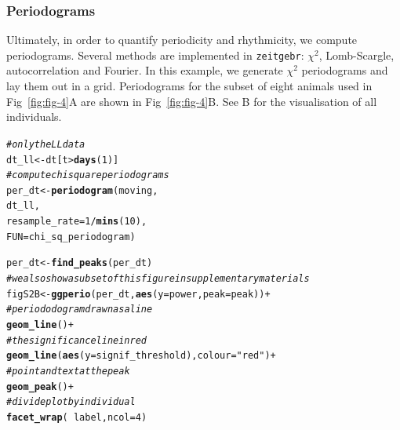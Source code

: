\documentclass[10pt,letterpaper]{article}\usepackage[]{graphicx}\usepackage[]{color}
\makeatletter
\newcommand{\hlnum}[1]{\textcolor[rgb]{0.686,0.059,0.569}{#1}}%
\newcommand{\hlstr}[1]{\textcolor[rgb]{0.192,0.494,0.8}{#1}}%
\newcommand{\hlcom}[1]{\textcolor[rgb]{0.678,0.584,0.686}{\textit{#1}}}%
\newcommand{\hlopt}[1]{\textcolor[rgb]{0,0,0}{#1}}%
\newcommand{\hlstd}[1]{\textcolor[rgb]{0.345,0.345,0.345}{#1}}%
\newcommand{\hlkwb}[1]{\textcolor[rgb]{0.69,0.353,0.396}{#1}}%
\newcommand{\hlkwc}[1]{\textcolor[rgb]{0.333,0.667,0.333}{#1}}%
\newcommand{\hlkwd}[1]{\textcolor[rgb]{0.737,0.353,0.396}{\textbf{#1}}}%
\newenvironment{kframe}{%
 \def\at@end@of@kframe{}%
 \ifinner\ifhmode%
  \def\at@end@of@kframe{\end{minipage}}%
  \begin{minipage}{\columnwidth}%
 \fi\fi%
 \def\FrameCommand##1{\hskip\@totalleftmargin \hskip-\fboxsep
 \colorbox{shadecolor}{##1}\hskip-\fboxsep
     \hskip-\linewidth \hskip-\@totalleftmargin \hskip\columnwidth}%
 \MakeFramed {\advance\hsize-\width
   \@totalleftmargin\z@ \linewidth\hsize
   \@setminipage}}%
 {\par\unskip\endMakeFramed%
 \at@end@of@kframe}
\newenvironment{knitrout}{}{} %
\makeatother
\begin{document}
\subsubsection*{Periodograms}
Ultimately, in order to quantify periodicity and rhythmicity, we compute periodograms.
Several methods are implemented in \texttt{zeitgebr}: $\chi{}^2$, Lomb-Scargle, autocorrelation 
and Fourier.
In this example, we generate $\chi{}^2$ periodograms and lay them out in a grid.
Periodograms for the subset of eight animals used in Fig~\ref{fig:fig-4}A are shown in Fig~\ref{fig:fig-4}B. 
See B for the visualisation of all individuals.

\begin{knitrout}
\color{fgcolor}\begin{kframe}
\begin{alltt}
\hlcom{# only the LL data}
\hlstd{dt_ll} \hlkwb{<-} \hlstd{dt[t} \hlopt{>} \hlkwd{days}\hlstd{(}\hlnum{1}\hlstd{)]}
\hlcom{# compute chi square periodograms }
\hlstd{per_dt} \hlkwb{<-} \hlkwd{periodogram}\hlstd{(moving,}
                        \hlstd{dt_ll,}
                        \hlkwc{resample_rate} \hlstd{=} \hlnum{1} \hlopt{/} \hlkwd{mins}\hlstd{(}\hlnum{10}\hlstd{),}
                        \hlkwc{FUN}\hlstd{=chi_sq_periodogram)}

\hlstd{per_dt} \hlkwb{<-} \hlkwd{find_peaks}\hlstd{(per_dt)}
\hlcom{# we also show a subset of this figure in supplementary materials}
\hlstd{figS2B} \hlkwb{<-} \hlkwd{ggperio}\hlstd{(per_dt,} \hlkwd{aes}\hlstd{(}\hlkwc{y} \hlstd{= power,} \hlkwc{peak} \hlstd{= peak))} \hlopt{+}
                  \hlcom{# periododogram drawn as a line}
                  \hlkwd{geom_line}\hlstd{()} \hlopt{+}
                  \hlcom{# the significance line in red}
                  \hlkwd{geom_line}\hlstd{(}\hlkwd{aes}\hlstd{(}\hlkwc{y} \hlstd{= signif_threshold),} \hlkwc{colour} \hlstd{=} \hlstr{"red"}\hlstd{)} \hlopt{+}
                  \hlcom{# point and text at the peak}
                  \hlkwd{geom_peak}\hlstd{()} \hlopt{+}
                  \hlcom{# divide plot by individual}
                  \hlkwd{facet_wrap}\hlstd{(} \hlopt{~} \hlstd{label,} \hlkwc{ncol} \hlstd{=} \hlnum{4}\hlstd{)}
\end{alltt}
\end{kframe}
\end{knitrout}
\end{document}
